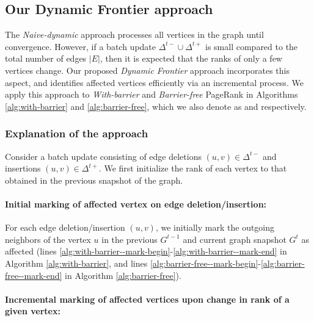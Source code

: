 \subsection{Our Dynamic Frontier approach}
\label{sec:frontier}

The \textit{Naive-dynamic} approach processes all vertices in the graph until convergence. However, if a batch update $\Delta^{t-} \cup \Delta^{t+}$ is small compared to the total number of edges $|E|$, then it is expected that the ranks of only a few vertices change. Our proposed \textit{Dynamic Frontier} approach incorporates this aspect, and identifies affected vertices efficiently via an incremental process. We apply this approach to \textit{With-barrier} and \textit{Barrier-free} PageRank in Algorithms \ref{alg:with-barrier} and \ref{alg:barrier-free}, which we also denote as \FroWbar{} and \FroBarf{} respectively.



\subsubsection{Explanation of the approach}
\label{sec:frontier-explanation}

Consider a batch update consisting of edge deletions $(u, v) \in \Delta^{t-}$ and insertions $(u, v) \in \Delta^{t+}$. We first initialize the rank of each vertex to that obtained in the previous snapshot of the graph.



\paragraph{Initial marking of affected vertex on edge deletion/insertion:}

For each edge deletion/insertion $(u, v)$, we initially mark the outgoing neighbors of the vertex $u$ in the previous $G^{t-1}$ and current graph snapshot $G^t$ as affected (lines \ref{alg:with-barrier--mark-begin}-\ref{alg:with-barrier--mark-end} in Algorithm \ref{alg:with-barrier}, and lines \ref{alg:barrier-free--mark-begin}-\ref{alg:barrier-free--mark-end} in Algorithm \ref{alg:barrier-free}).

\paragraph{Incremental marking of affected vertices upon change in rank of a given vertex:}

